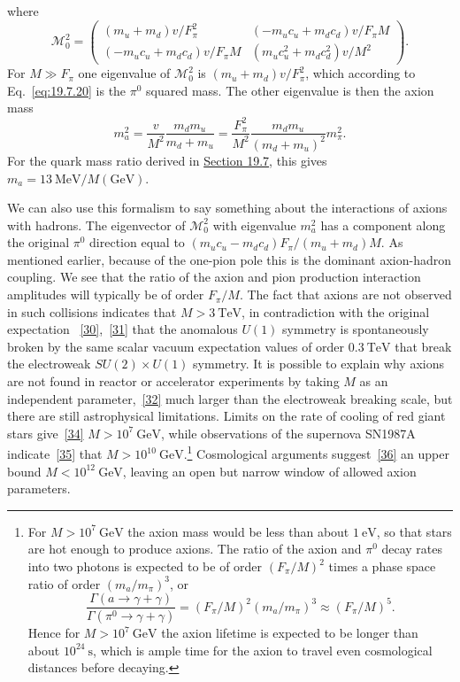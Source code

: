 where
\begin{equation}
\mathcal M_0^2=
\begin{pmatrix}
(m_u+m_d)v/F_\pi^2&
(-m_uc_u+m_dc_d)v/F_\pi M\\
(-m_uc_u+m_dc_d)v/F_\pi M&
(m_uc_u^2+m_dc_d^2)v/M^2
\end{pmatrix}.
\tag{23.6.25}\label{eq:23.6.25}
\end{equation}
For $M\gg F_\pi$ one eigenvalue of $\mathcal M_0^2$ is
$(m_u+m_d)v/F_\pi^2$, which according to Eq.~\eqref{eq:19.7.20} is the
$\pi^0$ squared mass. The other eigenvalue is then the axion mass
\begin{equation}
m_a^2=\frac{v}{M^2}\frac{m_dm_u}{m_d+m_u}
=\frac{F_\pi^2}{M^2}\frac{m_dm_u}{(m_d+m_u)^2}m_\pi^2.
\tag{23.6.26}\label{eq:23.6.26}
\end{equation}
For the quark mass ratio derived in \hyperref[sec:19.7]{Section 19.7},
this gives $m_a=13\ \mathrm{MeV}/M(\mathrm{GeV})$.

We can also use this formalism to say something about the interactions
of axions with hadrons. The eigenvector of $\mathcal M_0^2$ with
eigenvalue $m_a^2$ has a component along the original $\pi^0$ direction
equal to $(m_uc_u-m_dc_d)F_\pi/(m_u+m_d)M$. As mentioned earlier,
because of the one-pion pole this is the dominant axion-hadron coupling.
We see that the ratio of the axion and pion production interaction
amplitudes will typically be of order $F_\pi/M$. The fact that axions
are not observed in such collisions indicates that $M>3\ \mathrm{TeV}$,
in contradiction with the original expectation
~\hyperref[ch23-ref-30]{[30]},~\hyperref[ch23-ref-31]{[31]} that the
anomalous $U(1)$ symmetry is spontaneously broken by the same scalar
vacuum expectation values of order $0.3\ \mathrm{TeV}$ that break the
electroweak $SU(2)\times U(1)$ symmetry. It is possible to explain why
axions are not found in reactor or accelerator experiments by taking $M$
as an independent parameter,~\hyperref[ch23-ref-32]{[32]} much larger
than the electroweak breaking scale, but there are still astrophysical
limitations. Limits on the rate of cooling of red giant stars
give~\hyperref[ch23-ref-34]{[34]} $M>10^7\ \mathrm{GeV}$, while
observations of the supernova SN1987A
indicate~\hyperref[ch23-ref-35]{[35]} that
$M>10^{10}\ \mathrm{GeV}$.\footnote{For $M>10^7\ \mathrm{GeV}$ the
axion mass would be less than about $1\ \mathrm{eV}$, so that stars are
hot enough to produce axions. The ratio of the axion and $\pi^0$ decay
rates into two photons is expected to be of order $(F_\pi/M)^2$ times a
phase space ratio of order $(m_a/m_\pi)^3$, or
\[
\frac{\Gamma(a\to\gamma+\gamma)}
{\Gamma(\pi^0\to\gamma+\gamma)}
=(F_\pi/M)^2(m_a/m_\pi)^3\approx(F_\pi/M)^5.
\]
Hence for $M>10^7\ \mathrm{GeV}$ the axion lifetime is expected to be
longer than about $10^{24}\ \mathrm{s}$, which is ample time for the
axion to travel even cosmological distances before decaying.}
Cosmological arguments suggest~\hyperref[ch23-ref-36]{[36]} an upper
bound $M<10^{12}\ \mathrm{GeV}$, leaving an open but narrow window of
allowed axion parameters.
